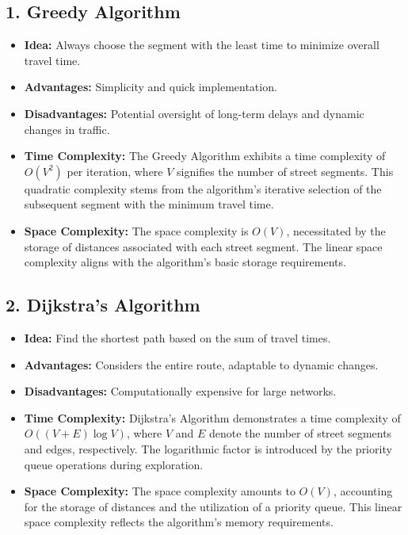 \documentclass[a4paper, 12pt]{article}
\begin{document}
	\subsection*{1. Greedy Algorithm}
	\begin{itemize}
		\item \textbf{Idea:} Always choose the segment with the least time to minimize overall travel time.
		\item \textbf{Advantages:} Simplicity and quick implementation.
		\item \textbf{Disadvantages:} Potential oversight of long-term delays and dynamic changes in traffic.
	 \item \textbf{Time Complexity:} The Greedy Algorithm exhibits a time complexity of $O(V^2)$ per iteration, where $V$ signifies the number of street segments. This quadratic complexity stems from the algorithm's iterative selection of the subsequent segment with the minimum travel time.
	\item \textbf{Space Complexity:} The space complexity is $O(V)$, necessitated by the storage of distances associated with each street segment. The linear space complexity aligns with the algorithm's basic storage requirements.
	\end{itemize}
	
	\subsection*{2. Dijkstra's Algorithm}
	\begin{itemize}
		\item \textbf{Idea:} Find the shortest path based on the sum of travel times.
		\item \textbf{Advantages:} Considers the entire route, adaptable to dynamic changes.
		\item \textbf{Disadvantages:} Computationally expensive for large networks. 
		  \item \textbf{Time Complexity:} Dijkstra's Algorithm demonstrates a time complexity of $O((V + E) \log V)$, where $V$ and $E$ denote the number of street segments and edges, respectively. The logarithmic factor is introduced by the priority queue operations during exploration.
		 \item \textbf{Space Complexity:} The space complexity amounts to $O(V)$, accounting for the storage of distances and the utilization of a priority queue. This linear space complexity reflects the algorithm's memory requirements.
		 
	\end{itemize}
	
\end{document}
